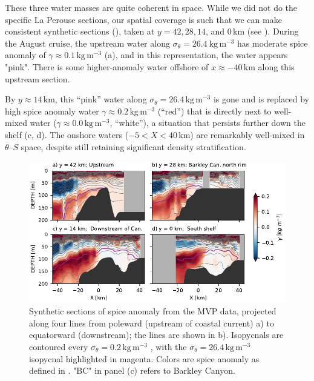 \documentclass[draft]{agujournal2019}
\begin{document}
These three water masses are quite coherent in space.  While we did not do the specific La Perouse sections, our spatial coverage is such that we can make consistent synthetic sections (), taken at $y=42, 28, 14$, and $0\, \mathrm{km}$ (see ).  During the August cruise, the upstream water along $\sigma_{\theta} = 26.4\ \mathrm{kg\,m^{-3}}$ has moderate spice anomaly of  $\gamma \approx 0.1\,\mathrm{kg\,m^{-3}}$ (a), and in this representation, the water appears "pink".  There is some higher-anomaly water offshore of $x \approx -40\, \mathrm{km}$ along this upstream section.

By $y\approx 14\, \mathrm{km}$, this ``pink'' water along $\sigma_{\theta} = 26.4\,\mathrm{kg\,m^{-3}}$ is gone and is replaced by high spice anomaly water $\gamma \approx 0.2 \,\mathrm{kg\,m^{-3}}$ (``red'') that is directly next to well-mixed water ($\gamma \approx 0.0 \,\mathrm{kg\,m^{-3}}$, ``white''), a situation that persists further down the shelf (c, d).  The onshore waters ($-5 < X < 40\, \mathrm{km}$) are remarkably well-mixed in $\theta$--$S$ space, despite still retaining significant density stratification.

\begin{figure}[htbp]
  \begin{center}
    \includegraphics[width=6.2in]{CrossSectionsSpice}
    \caption{Synthetic sections of spice anomaly from the MVP data, projected along four lines from poleward (upstream of coastal current) a) to equatorward (downstream); the lines are shown in b).    Isopycnals are contoured every $\sigma_{\theta} = 0.2\,\mathrm{kg\,m^{-3}}$ , with the $\sigma_{\theta} = 26.4\,\mathrm{kg\,m^{-3}}$ isopycnal highlighted in magenta.  Colors are spice anomaly as defined in . "BC" in panel (c) refers to Barkley Canyon.
      \label{fig:CrossSectionsSpice} }
  \end{center}
\end{figure}
\end{document}
